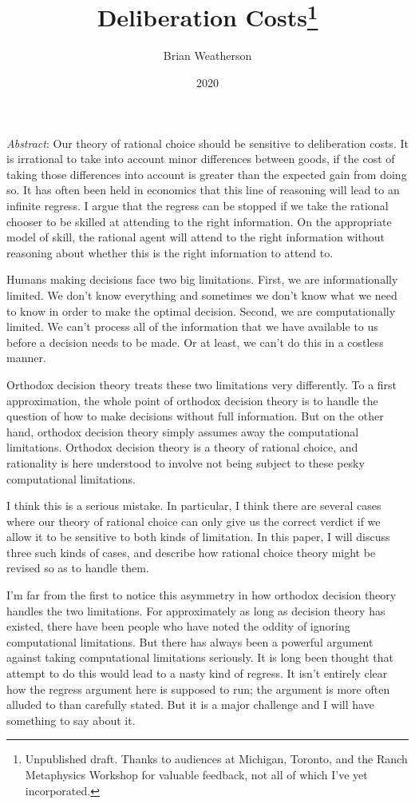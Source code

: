 \documentclass[
  11pt,
  letterpaper,
  DIV=11,
  numbers=noendperiod,
  twoside]{scrartcl}
\title{Deliberation Costs\thanks{Unpublished draft. Thanks to audiences
at Michigan, Toronto, and the Ranch Metaphysics Workshop for valuable
feedback, not all of which I've yet incorporated.}}
\author{Brian Weatherson}
\date{2020}
\renewenvironment{abstract}
 {\vspace{-1.25cm}
 \quotation\small\noindent\emph{Abstract}:}
 {\endquotation}
\begin{document}
\maketitle
\begin{abstract}
Our theory of rational choice should be sensitive to deliberation costs.
It is irrational to take into account minor differences between goods,
if the cost of taking those differences into account is greater than the
expected gain from doing so. It has often been held in economics that
this line of reasoning will lead to an infinite regress. I argue that
the regress can be stopped if we take the rational chooser to be skilled
at attending to the right information. On the appropriate model of
skill, the rational agent will attend to the right information without
reasoning about whether this is the right information to attend to.
\end{abstract}


Humans making decisions face two big limitations. First, we are
informationally limited. We don't know everything and sometimes we don't
know what we need to know in order to make the optimal decision. Second,
we are computationally limited. We can't process all of the information
that we have available to us before a decision needs to be made. Or at
least, we can't do this in a costless manner.

Orthodox decision theory treats these two limitations very differently.
To a first approximation, the whole point of orthodox decision theory is
to handle the question of how to make decisions without full
information. But on the other hand, orthodox decision theory simply
assumes away the computational limitations. Orthodox decision theory is
a theory of rational choice, and rationality is here understood to
involve not being subject to these pesky computational limitations.

I think this is a serious mistake. In particular, I think there are
several cases where our theory of rational choice can only give us the
correct verdict if we allow it to be sensitive to both kinds of
limitation. In this paper, I will discuss three such kinds of cases, and
describe how rational choice theory might be revised so as to handle
them.

I'm far from the first to notice this asymmetry in how orthodox decision
theory handles the two limitations. For approximately as long as
decision theory has existed, there have been people who have noted the
oddity of ignoring computational limitations. But there has always been
a powerful argument against taking computational limitations seriously.
It is long been thought that attempt to do this would lead to a nasty
kind of regress. It isn't entirely clear how the regress argument here
is supposed to run; the argument is more often alluded to than carefully
stated. But it is a major challenge and I will have something to say
about it.
\end{document}

